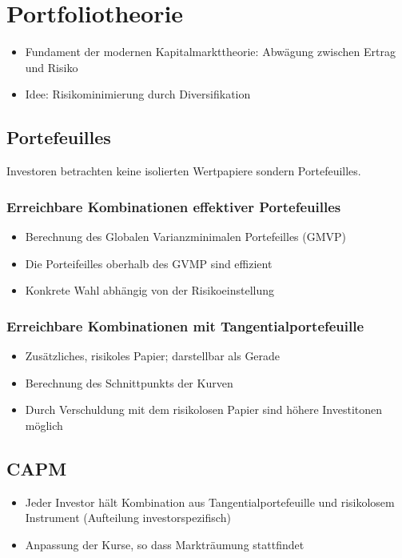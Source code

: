 \section{Portfoliotheorie}
\begin{itemize}
	\item Fundament der modernen Kapitalmarkttheorie: Abwägung zwischen Ertrag und Risiko
	\item Idee: Risikominimierung durch Diversifikation
\end{itemize}


\subsection{Portefeuilles}
Investoren betrachten keine isolierten Wertpapiere sondern Portefeuilles.

\subsubsection{Erreichbare Kombinationen effektiver Portefeuilles}
\begin{itemize}
	\item Berechnung des Globalen Varianzminimalen Portefeilles (GMVP)
	\item Die Porteifeilles oberhalb des GVMP sind effizient
	\item Konkrete Wahl abhängig von der Risikoeinstellung
\end{itemize}

\subsubsection{Erreichbare Kombinationen mit Tangentialportefeuille}
\begin{itemize}
	\item Zusätzliches, risikoles Papier; darstellbar als Gerade
	\item Berechnung des Schnittpunkts der Kurven
	\item Durch Verschuldung mit dem risikolosen Papier sind höhere Investitonen möglich
\end{itemize}


\subsection{CAPM}
\begin{itemize}
	\item Jeder Investor hält Kombination aus Tangentialportefeuille und risikolosem Instrument (Aufteilung investorspezifisch)
	\item Anpassung der Kurse, so dass Markträumung stattfindet
\end{itemize}

